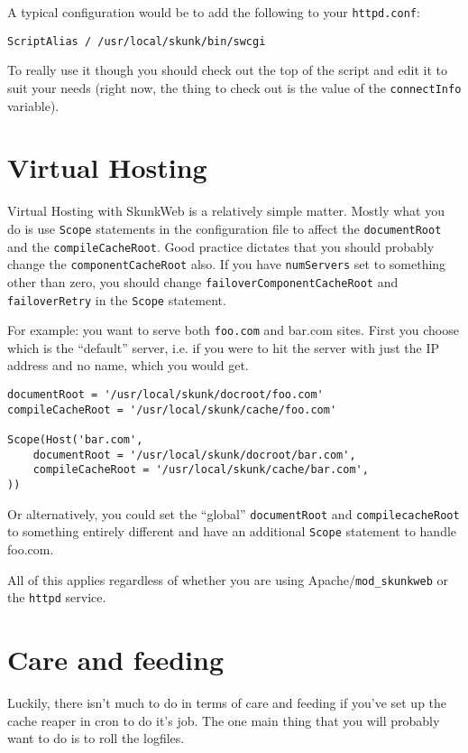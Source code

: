 \documentclass[titlepage]{manual}
\begin{document}
A typical configuration would be to add the following to your
\texttt{httpd.conf}:
\begin{verbatim}
ScriptAlias / /usr/local/skunk/bin/swcgi
\end{verbatim}

To really use it though you should check out the top of the script and
edit it to suit your needs (right now, the thing to check out is the
value of the \texttt{connectInfo} variable).

\chapter{Virtual Hosting}
Virtual Hosting with SkunkWeb is a relatively simple matter.  Mostly
what you do is use \texttt{Scope} statements in the configuration file
to affect the \texttt{documentRoot} and the \texttt{compileCacheRoot}.
Good practice dictates that you should probably change the
\texttt{componentCacheRoot} also.  If you have \texttt{numServers} set
to something other than zero, you should change
\texttt{failoverComponentCacheRoot} and \texttt{failoverRetry} in the
\texttt{Scope} statement.

For example:  you want to serve both \texttt{foo.com} and {bar.com} sites.
First you choose which is the ``default'' server, i.e. if you were to hit
the server with just the IP address and no name, which you would get.

\begin{verbatim}
documentRoot = '/usr/local/skunk/docroot/foo.com'
compileCacheRoot = '/usr/local/skunk/cache/foo.com'

Scope(Host('bar.com',
    documentRoot = '/usr/local/skunk/docroot/bar.com',
    compileCacheRoot = '/usr/local/skunk/cache/bar.com',
))    
\end{verbatim}

Or alternatively, you could set the ``global'' \texttt{documentRoot}
and \texttt{compilecacheRoot} to something entirely different and have
an additional \texttt{Scope} statement to handle foo.com.

All of this applies regardless of whether you are using
Apache/\texttt{mod\_skunkweb} or the \texttt{httpd} service.

\chapter{Care and feeding}
Luckily, there isn't much to do in terms of care and feeding if you've
set up the cache reaper in cron to do it's job.  The one main thing
that you will probably want to do is to roll the logfiles.
\end{document}
